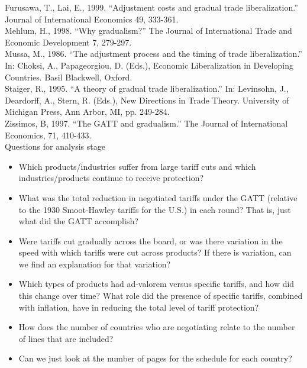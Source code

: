 \documentclass[12pt]{article}
\begin{document}
\noindent Furusawa, T., Lai, E., 1999. ``Adjustment costs and gradual trade liberalization.'' Journal of International
Economics 49, 333-361. \\

\noindent Mehlum, H., 1998. ``Why gradualism?'' The Journal of International Trade and Economic Development 7, 279-297. \\

\noindent Mussa, M., 1986. ``The adjustment process and the timing of trade liberalization.'' In: Choksi, A., Papageorgiou, D. (Eds.), Economic Liberalization in Developing Countries. Basil Blackwell, Oxford. \\

\noindent Staiger, R., 1995. ``A theory of gradual trade liberalization.'' In: Levinsohn, J., Deardorff, A., Stern, R.
(Eds.), New Directions in Trade Theory. University of Michigan Press, Ann Arbor, MI, pp. 249-284. \\

\noindent Zissimos, B, 1997. ``The GATT and gradualism.'' The Journal of International Economics, 71, 410-433.\\

\newpage
Questions for analysis stage
\begin{itemize}
	\item Which products/industries suffer from large tariff cuts and which industries/products continue to receive protection?
	\item What was the total reduction in negotiated tariffs under the GATT (relative to the 1930 Smoot-Hawley tariffs for the U.S.) in each round? That is, just what did the GATT accomplish?
	\item Were tariffs cut gradually across the board, or was there variation in the speed with which tariffs were cut across products? If there is variation, can we find an explanation for that variation?
	\item Which types of products had ad-valorem versus specific tariffs, and how did this change over time? What role did the presence of specific tariffs, combined with inflation, have in reducing the total level of tariff protection?
	\item How does the number of countries who are negotiating relate to the number of lines that are included?
	\item Can we just look at the number of pages for the schedule for each country?
\end{itemize}
\end{document}
